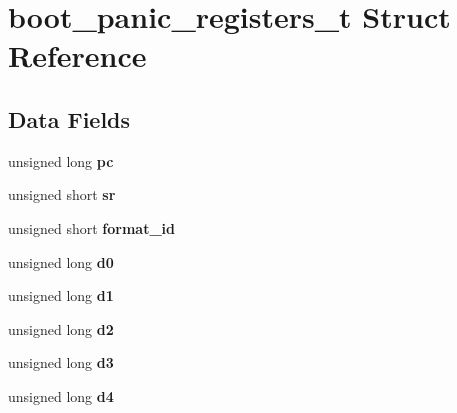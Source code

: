 \hypertarget{structboot__panic__registers__t}{}\section{boot\+\_\+panic\+\_\+registers\+\_\+t Struct Reference}
\label{structboot__panic__registers__t}
\subsection*{Data Fields}
\begin{DoxyCompactItemize}
\item 
\mbox{\label{structboot__panic__registers__t_a136667808507f5d999025eb77284741f}} 
unsigned long {\bfseries pc}
\item 
\mbox{\label{structboot__panic__registers__t_a0ead0986289ede783f58365c10dc810a}} 
unsigned short {\bfseries sr}
\item 
\mbox{\label{structboot__panic__registers__t_ab736e41f1def22bded0c6e76d69f8156}} 
unsigned short {\bfseries format\+\_\+id}
\item 
\mbox{\label{structboot__panic__registers__t_a605fd7a5d1cab4a2359bc9594eeff7fb}} 
unsigned long {\bfseries d0}
\item 
\mbox{\label{structboot__panic__registers__t_ae74a6bd2b555795b3a72d91de476e86b}} 
unsigned long {\bfseries d1}
\item 
\mbox{\label{structboot__panic__registers__t_aabb2ba3e79a84b100e58cb7444fa1e99}} 
unsigned long {\bfseries d2}
\item 
\mbox{\label{structboot__panic__registers__t_ac512fd37461587250e35fb5c22b79635}} 
unsigned long {\bfseries d3}
\item 
\mbox{\label{structboot__panic__registers__t_a43c01785b97792e8785c0c463af933f7}} 
unsigned long {\bfseries d4}
\item 
\mbox{\label{structboot__panic__registers__t_a34b1afb671fb17d1c19009244cdfa316}} 

\end{DoxyCompactItemize}
